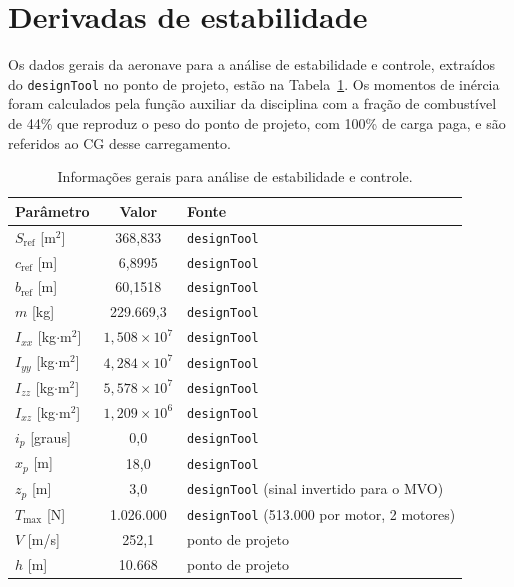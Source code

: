\newpage
\section{Derivadas de estabilidade}


Os dados gerais da aeronave para a análise de estabilidade e controle,
extraídos do \texttt{designTool} no ponto de projeto, estão na
Tabela~\ref{tab:dados_gerais}. Os momentos de inércia foram calculados pela
função auxiliar da disciplina com a fração de combustível de 44\% que
reproduz o peso do ponto de projeto, com 100\% de carga paga, e são
referidos ao CG desse carregamento.

\begin{table}[H]
\centering
\caption{Informações gerais para análise de estabilidade e controle.}\label{tab:dados_gerais}
\renewcommand{\arraystretch}{1.25}
\begin{tabular}{lcl}
\toprule
Parâmetro & Valor & Fonte \\
\midrule
$S_{\mathrm{ref}}$ [m$^2$] & 368,833 & \texttt{designTool} \\
$c_{\mathrm{ref}}$ [m] & 6,8995 & \texttt{designTool} \\
$b_{\mathrm{ref}}$ [m] & 60,1518 & \texttt{designTool} \\
$m$ [kg] & 229.669,3 & \texttt{designTool} \\
$I_{xx}$ [kg$\cdot$m$^2$] & $1{,}508\times 10^{7}$ & \texttt{designTool} \\
$I_{yy}$ [kg$\cdot$m$^2$] & $4{,}284\times 10^{7}$ & \texttt{designTool} \\
$I_{zz}$ [kg$\cdot$m$^2$] & $5{,}578\times 10^{7}$ & \texttt{designTool} \\
$I_{xz}$ [kg$\cdot$m$^2$] & $1{,}209\times 10^{6}$ & \texttt{designTool} \\
$i_p$ [graus] & 0,0 & \texttt{designTool} \\
$x_p$ [m] & 18,0 & \texttt{designTool} \\
$z_p$ [m] & 3,0 & \texttt{designTool} (sinal invertido para o MVO) \\
$T_{\mathrm{max}}$ [N] & 1.026.000 & \texttt{designTool} (513.000 por motor, 2 motores) \\
$V$ [m/s] & 252,1 & ponto de projeto \\
$h$ [m] & 10.668 & ponto de projeto \\
\bottomrule
\end{tabular}
\end{table}

